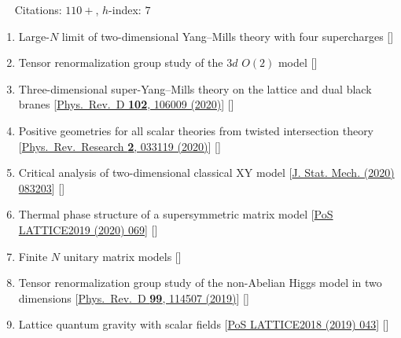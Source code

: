 ~~ Citations: $110+$, $h$-index: $7$
\begin{enumerate}
 \item Large-$N$ limit of two-dimensional Yang--Mills theory with four supercharges [\texttt{\textbf{}}] 
 \item Tensor renormalization group study of the $3d$ $O(2)$ model [\texttt{\textbf{}}] 
 \item Three-dimensional super-Yang--Mills theory on the lattice and dual black branes [\href{https://journals.aps.org/prd/abstract/10.1103/PhysRevD.102.106009}{Phys.\ Rev.\ D {\bf 102}, 106009 (2020)}] [\textbf{\texttt{}}] 
 \item Positive geometries for all scalar theories from twisted intersection theory [\href{https://journals.aps.org/prresearch/abstract/10.1103/PhysRevResearch.2.033119}{Phys.\ Rev.\ Research {\bf 2}, 033119 (2020)}] [\texttt{\textbf{}}] 
  \item Critical analysis of two-dimensional classical XY model [\href{https://iopscience.iop.org/article/10.1088/1742-5468/aba686/pdf}{J. Stat. Mech. (2020) 083203}] [\texttt{\textbf{}}] 
 \item Thermal phase structure of a supersymmetric matrix model [\href{https://pos.sissa.it/363/069}{PoS LATTICE2019 (2020) 069}] [\texttt{\textbf{}}] %
 \item  Finite $N$ unitary matrix models [\textbf{\texttt{}}] 
  \item Tensor renormalization group study of the non-Abelian Higgs model in two dimensions [\href{https://journals.aps.org/prd/abstract/10.1103/PhysRevD.99.114507}{Phys.\ Rev.\ D {\bf 99}, 114507 (2019)}] [\texttt{\textbf{}}] 
 \item  Lattice quantum gravity with scalar fields [\href{https://pos.sissa.it/334/043}{PoS LATTICE2018 (2019) 043}] [\texttt{\textbf{}}] %

\end{enumerate}
